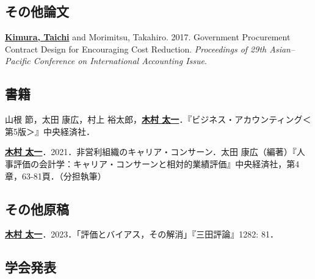 \documentclass[letterpaper,uplatex]{article}
\renewenvironment{itemize}{
  \begin{list}{}{
    \setlength{\leftmargin}{1.5em}
  }
}{
  \end{list}
}
\begin{document}
\subsection*{その他論文}

\begin{itemize}
    \item \underline{\textbf{Kimura, Taichi}} and Morimitsu, Takahiro. 2017. Government Procurement Contract Design for Encouraging Cost Reduction. \textit{Proceedings of 29th Asian--Pacific Conference on International Accounting Issue}.
\end{itemize}

\subsection*{書籍}

\begin{itemize}
    \item 山根 節，太田 康広，村上 裕太郎，\underline{\textbf{木村 太一}}．『ビジネス・アカウンティング＜第5版＞』中央経済社．
	\item \underline{\textbf{木村 太一}}．2021．非営利組織のキャリア・コンサーン．太田 康広（編著）『人事評価の会計学：キャリア・コンサーンと相対的業績評価』中央経済社，第4章，63-81頁．（分担執筆）
\end{itemize}

\subsection*{その他原稿}

\begin{itemize}
    \item \underline{\textbf{木村 太一}}．2023．「評価とバイアス，その解消」『三田評論』1282: 81．
\end{itemize}

\subsection*{学会発表}
\end{document}
